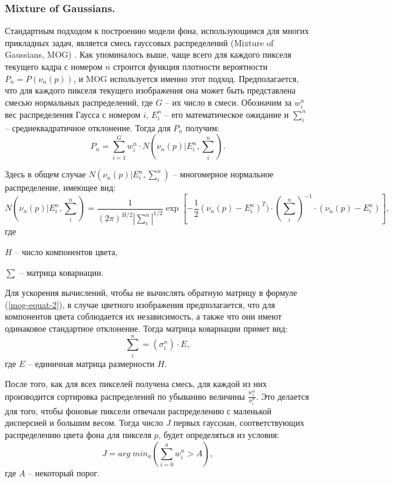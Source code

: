 \subsubsection{Mixture of Gaussians.}

Стандартным подходом к построению модели фона, использующимся для многих
прикладных задач, является смесь гауссовых распределений (Mixture of Gaussians,
MOG) \cite{MOG-1, MOG-2}. Как упоминалось выше, чаще всего для каждого пикселя
текущего кадра с номером $n$ строится функция плотности вероятности 
$P_n=P(\nu_n(p))$, и MOG используется именно этот подход. Предполагается, что 
для каждого пикселя текущего изображения она может быть представлена смесью
нормальных распределений, где $G$ -- их число в смеси.
Обозначим за $w_i^n$ вес распределения Гаусса с номером $i$, $E_i^n$ -- его
математическое ожидание и $\sum^n_i$ -- среднеквадратичное отклонение.
Тогда для $P_n$ получим:
\begin{equation}
	P_n = \sum_{i=1}^G{w_i^n} \cdot N(\nu_n(p)|E^n_i, \sum_i^n).
	\label{mog-equat-1}
\end{equation} 

Здесь в общем случае $N(\nu_n(p)|E^n_i, \sum_i^n)$ -- многомерное 
нормальное распределение, имеющее вид:
\begin{equation}
	N(\nu_n(p)|E^n_i, \sum_i^n) = 
	\frac{1}{(2\pi)^{H/2}|\sum_i^n|^{1/2}}
	\exp[-\frac{1}{2}(\nu_n(p) - E_i^n)^T) \cdot (\sum^n_i)^{-1} 
	\cdot (\nu_n(p) - E^n_i)],
	\label{mog-equat-2}
\end{equation} 
где

$H$ -- число компонентов цвета,

$\sum$ -- матрица ковариации.

Для ускорения вычислений, чтобы не вычислять обратную матрицу в формуле 
(\ref{mog-equat-2}), в случае цветного изображения предполагается, что для
компонентов цвета соблюдается их независимость, а также что они имеют 
одинаковое стандартное отклонение. Тогда матрица ковариации примет вид:
\begin{equation}
	\sum_i^n= (\sigma_i^n) \cdot E,
	\label{mog-equat-3}
\end{equation}
где $E$ -- единичная матрица размерности $H$.

После того, как для всех пикселей получена смесь, для каждой из них производится
сортировка распределений по убыванию величины $\frac{w^n_i}{\sigma^n_i}$.
Это делается для того, чтобы фоновые пиксели отвечали распределению с маленькой 
дисперсией и большим весом. Тогда число $J$ первых гауссиан, соответствующих
распределению цвета фона для пикселя $p$, будет определяться из условия:
\begin{equation}
	J=arg~{min}_a(\sum^a_{i=0}{w^n_i}>A),
	\label{mog-equat-4}
\end{equation} 
где $A$ -- некоторый порог.

